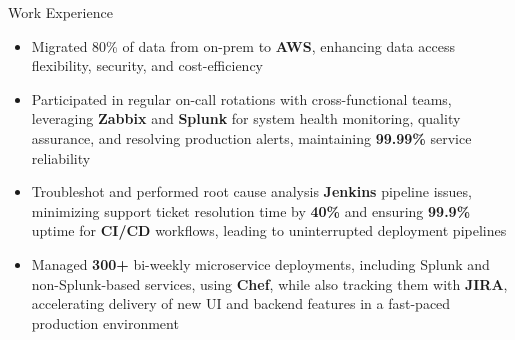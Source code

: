 \documentclass{resume}
\begin{document}
\begin{experienceSection}{Work Experience}
    \experienceItem[
        company={Cerner Healthcare (Oracle Health)},
        location={Bangalore, India},
        position={System Engineer - 1},
        duration={May 2021 - Jul 2023}
    ]
    \begin{itemize}
        \itemsep -6pt {}
        \item Migrated 80\% of data from on-prem to \textbf{AWS}, enhancing data access flexibility, security, and cost-efficiency
        \item Participated in regular on-call rotations with cross-functional teams, leveraging \textbf{Zabbix} and \textbf{Splunk} for system health monitoring, quality assurance, and resolving production alerts, maintaining \textbf{99.99\%} service reliability
        \item Troubleshot and performed root cause analysis \textbf{Jenkins} pipeline issues, minimizing support ticket resolution time by \textbf{40\%} and ensuring \textbf{99.9\%} uptime for \textbf{CI/CD} workflows, leading to uninterrupted deployment pipelines
        \item Managed \textbf{300+} bi-weekly microservice deployments, including Splunk and non-Splunk-based services, using \textbf{Chef}, while also tracking them with \textbf{JIRA}, accelerating delivery of new UI and backend features in a fast-paced production environment
    \end{itemize}

\end{experienceSection}
\end{document}

